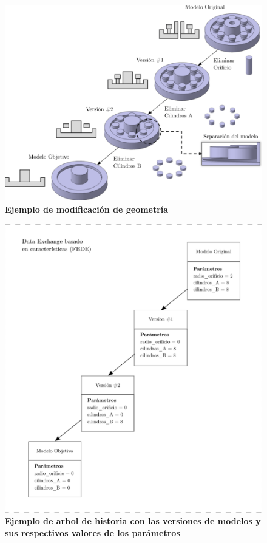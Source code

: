 \begin{figure}[h]
\includegraphics[width=14cm]{Img/WEB/de2.png}
\centering
\caption{\textbf{\footnotesize{Ejemplo de modificación de geometría}}}
\label{fig:de2}
\end{figure}

\begin{figure}[h]
\includegraphics[width=14cm]{Img/WEB/de3.png}
\centering
\caption{\textbf{\footnotesize{Ejemplo de arbol de historia con las versiones de modelos y sus respectivos valores de los parámetros}}}
\label{fig:de3}
\end{figure}

